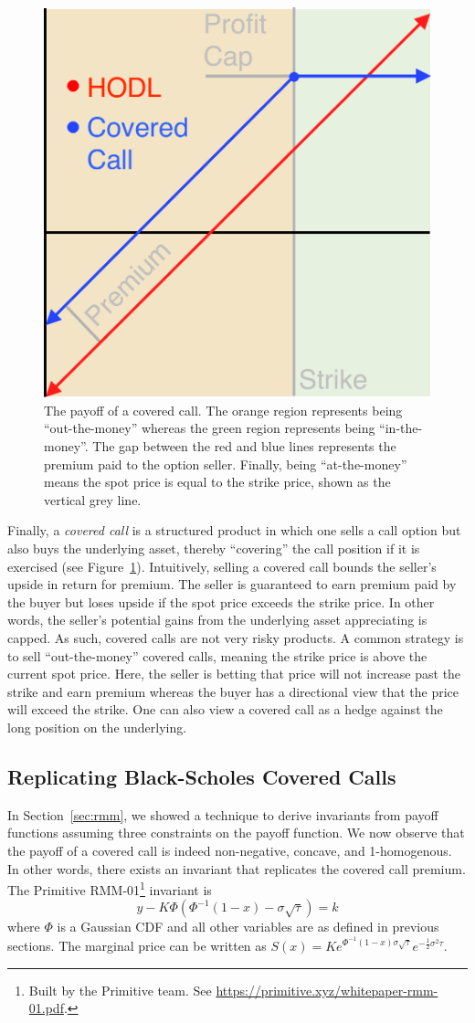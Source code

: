 \documentclass[hidelinks, 12pt]{article}
\begin{document}
\begin{figure}[h!]
    \centering
    \includegraphics[width=0.5\linewidth]{coveredcall.pdf}
    \caption{The payoff of a covered call. The orange  region represents being ``out-the-money'' whereas the green region represents being ``in-the-money''. The gap between the red and blue lines represents the premium paid to the option seller. Finally, being ``at-the-money'' means the spot price is equal to the strike price, shown as the vertical grey line.}
    \label{fig:covercall}
\end{figure}

Finally, a \textit{covered call} is a structured product in which one sells a call option but also buys the underlying asset, thereby ``covering'' the call position if it is exercised (see Figure~\ref{fig:covercall}). Intuitively, selling a covered call bounds the seller's upside in return for premium. The seller is guaranteed to earn premium paid by the buyer but loses upside if the spot price exceeds the strike price. In other words, the seller's potential gains from the underlying asset appreciating is capped. As such, covered calls are not very risky products. A common strategy is to sell ``out-the-money'' covered calls, meaning the strike price is above the current spot price. Here, the seller is betting that price will not increase past the strike and earn premium whereas the buyer has a directional view that the price will exceed the strike. One can also view a covered call as a hedge against the long position on the underlying.

\subsection{Replicating Black-Scholes Covered Calls}
\label{sec:coveredcall}

In Section~\ref{sec:rmm}, we showed a technique to derive invariants from payoff functions assuming three constraints on the payoff function. We now observe that the payoff of a covered call is indeed non-negative, concave, and 1-homogenous. In other words, there exists an invariant that replicates the covered call premium. The Primitive RMM-01\footnote{Built by the Primitive team. See \url{https://primitive.xyz/whitepaper-rmm-01.pdf}.} invariant is
\[y - K\Phi(\Phi^{-1}(1-x)-\sigma\sqrt{\tau}) = k\]
where $\Phi$ is a Gaussian CDF and all other variables are as defined in previous sections. The marginal price can be written as $S(x) = Ke^{\Phi^{-1}(1-x)\sigma\sqrt{\tau}}e^{-\frac{1}{2}\sigma^2\tau}$.
\end{document}
